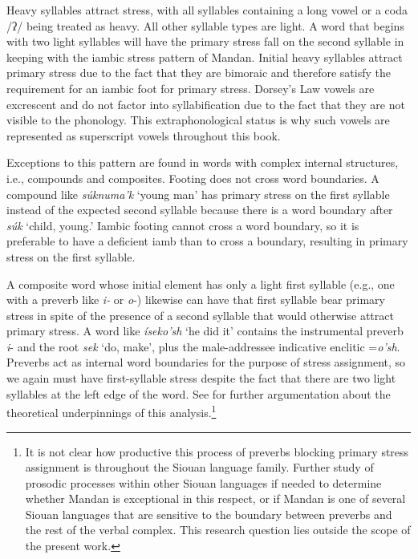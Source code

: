 Heavy syllables attract stress, with all syllables containing a long vowel or a coda /ʔ/ being treated as heavy. All other syllable types are light. A word that begins with two light syllables will have the primary stress fall on the second syllable in keeping with the iambic stress pattern of Mandan. Initial heavy syllables attract primary stress due to the fact that they are bimoraic and therefore satisfy the requirement for an iambic foot for primary stress. Dorsey's Law vowels are excrescent and do not factor into syllabification due to the fact that they are not visible to the phonology. This extraphonological status is why such vowels are represented as superscript vowels throughout this book.

Exceptions to this pattern are found in words with complex internal structures, i.e., compounds and composites. Footing does not cross word boundaries. A compound like \textit{súknuma'k} `young man' has primary stress on the first syllable instead of the expected second syllable because there is a word boundary after \textit{súk} `child, young.' Iambic footing cannot cross a word boundary, so it is preferable to have a deficient iamb than to cross a boundary, resulting in primary stress on the first syllable.

A composite word whose initial element has only a light first syllable (e.g., one with a preverb like \textit{i-} or  \textit{o}-) likewise can have that first syllable bear primary stress in spite of the presence of a second syllable that would otherwise attract primary stress. A word like \textit{íseko'sh} `he did it' contains the instrumental preverb \textit{i}- and the root \textit{sek} `do, make', plus the male-addressee indicative enclitic =\textit{o'sh}. Preverbs act as internal word boundaries for the purpose of stress assignment, so we again must have first-syllable stress despite the fact that there are two light syllables at the left edge of the word. See \citet{kasak2019} for further argumentation about the theoretical underpinnings of this analysis.\footnote{It is not clear how productive this process of preverbs blocking primary stress assignment is throughout the Siouan language family. Further study of prosodic processes within other Siouan languages if needed to determine whether Mandan is exceptional in this respect, or if Mandan is one of several Siouan languages that are sensitive to the boundary between preverbs and the rest of the verbal complex. This research question lies outside the scope of the present work.}

